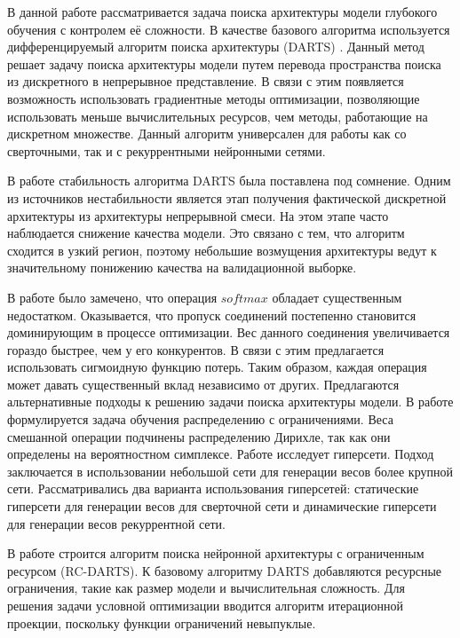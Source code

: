 \documentclass[12pt, twoside]{article}
\begin{document}
В данной работе рассматривается задача поиска архитектуры модели глубокого обучения с контролем её сложности. В качестве базового алгоритма используется дифференцируемый алгоритм поиска архитектуры (DARTS) \cite{journals/corr/abs-1806-09055}. Данный метод решает задачу поиска архитектуры модели путем перевода пространства поиска из дискретного в непрерывное представление. В связи с этим появляется возможность использовать градиентные методы оптимизации, позволяющие использовать меньше вычислительных ресурсов, чем методы, работающие на дискретном множестве. Данный алгоритм универсален для работы как со сверточными, так и с рекуррентными нейронными сетями.

В работе \cite{journals/corr/abs-2002-05283} стабильность алгоритма DARTS была поставлена под сомнение. Одним из источников нестабильности является этап получения фактической дискретной архитектуры из архитектуры непрерывной смеси. На этом этапе часто наблюдается снижение качества модели. Это связано с тем, что алгоритм сходится в узкий регион, поэтому  небольшие возмущения архитектуры ведут к значительному понижению качества на валидационной выборке. 

В работе \cite{journals/corr/abs-1911-12126} было замечено, что операция $softmax$ обладает существенным недостатком. Оказывается, что пропуск соединений постепенно становится доминирующим в процессе оптимизации. Вес данного соединения увеличивается гораздо быстрее, чем у его конкурентов. В связи с этим предлагается использовать сигмоидную  функцию потерь. Таким образом, каждая операция может давать существенный вклад независимо от других. Предлагаются альтернативные подходы к решению задачи поиска архитектуры модели. В работе \cite{journals/corr/abs-2006-10355} формулируется задача обучения распределению с ограничениями. Веса смешанной операции подчинены распределению Дирихле, так как они определены на вероятностном симплексе. Работе \cite{journals/corr/HaDL16} исследует гиперсети. Подход заключается в использовании небольшой сети для генерации весов более крупной сети. Рассматривались два варианта использования гиперсетей: статические гиперсети для генерации весов для сверточной сети и динамические гиперсети для генерации весов рекуррентной сети.

В работе \cite{journals/corr/abs-1912-12814} строится алгоритм поиска нейронной архитектуры с ограниченным ресурсом (RC-DARTS). К базовому алгоритму DARTS добавляются ресурсные ограничения, такие как размер модели и вычислительная сложность. Для решения задачи условной оптимизации вводится алгоритм итерационной проекции, поскольку функции ограничений невыпуклые.
\end{document}
